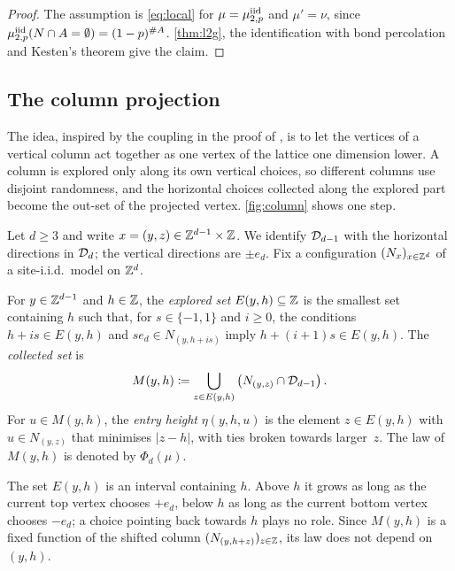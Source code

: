 \documentclass[11pt,letterpaper]{article}
\begin{document}
\begin{proof}
The assumption is \cref{eq:local} for $\mu=\mu^{\mathrm{iid}}_{2,p}$ and $\mu'=\nu$, since $\mu^{\mathrm{iid}}_{2,p}(N\cap A=\emptyset)=(1-p)^{\#A}$. \cref{thm:l2g}, the identification with bond percolation and Kesten's theorem give the claim.
\end{proof}

\subsection{The column projection}\label{sec:projection}

The idea, inspired by the coupling in the proof of \cite[Theorem~2.3]{JKLT25}, is to let the vertices of a vertical column act together as one vertex of the lattice one dimension lower. A column is explored only along its own vertical choices, so different columns use disjoint randomness, and the horizontal choices collected along the explored part become the out-set of the projected vertex. \cref{fig:column} shows one step.

Let $d\ge3$ and write $x=(y,z)\in\mathbb Z^{d-1}\times\mathbb Z$. We identify $\mathcal D_{d-1}$ with the horizontal directions in $\mathcal D_d$; the vertical directions are $\pm e_d$. Fix a configuration $(N_x)_{x\in\mathbb Z^d}$ of a site-i.i.d.\ model on $\mathbb Z^d$.

\begin{definition}\label{def:column}
For $y\in\mathbb Z^{d-1}$ and $h\in\mathbb Z$, the \emph{explored set} $E(y,h)\subseteq\mathbb Z$ is the smallest set containing $h$ such that, for $s\in\{-1,1\}$ and $i\ge0$, the conditions $h+is\in E(y,h)$ and $s e_d\in N_{(y,h+is)}$ imply $h+(i+1)s\in E(y,h)$. The \emph{collected set} is
\begin{equation*}
M(y,h)\coloneqq\bigcup_{z\in E(y,h)}\big(N_{(y,z)}\cap\mathcal D_{d-1}\big)\,.
\end{equation*}
For $u\in M(y,h)$, the \emph{entry height} $\eta(y,h,u)$ is the element $z\in E(y,h)$ with $u\in N_{(y,z)}$ that minimises $|z-h|$, with ties broken towards larger~$z$. The law of $M(y,h)$ is denoted by $\Phi_d(\mu)$.
\end{definition}

The set $E(y,h)$ is an interval containing $h$. Above $h$ it grows as long as the current top vertex chooses $+e_d$, below $h$ as long as the current bottom vertex chooses $-e_d$; a choice pointing back towards $h$ plays no role. Since $M(y,h)$ is a fixed function of the shifted column $(N_{(y,h+z)})_{z\in\mathbb Z}$, its law does not depend on $(y,h)$.
\end{document}

